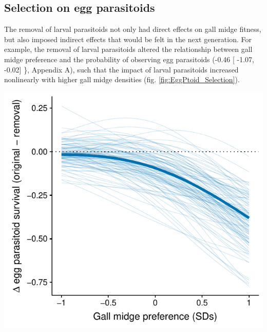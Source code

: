 \documentclass[11pt,]{article}
\let\origfigure\figure
\let\endorigfigure\endfigure
\renewenvironment{figure}[1][2] {
    \expandafter\origfigure\expandafter[H]
} {
    \endorigfigure
}
\begin{document}
\subsection{Selection on egg
parasitoids}\label{selection-on-egg-parasitoids}

The removal of larval parasitoids not only had direct effects on gall
midge fitness, but also imposed indirect effects that would be felt in
the next generation. For example, the removal of larval parasitoids
altered the relationship between gall midge preference and the
probability of observing egg parasitoids (-0.46 {[} -1.07, -0.02{]} \},
Appendix A), such that the impact of larval parasitoids increased
nonlinearly with higher gall midge densities (fig.
\ref{fig:EggPtoid_Selection}).

\begin{figure}
\centering
\includegraphics{../analyses/selection_on_Platygaster.pdf}
\caption{\label{fig:EggPtoid_Selection}Selection imposed by larval
parasitoids on egg parasitoids (\emph{Platygaster} sp.). The bold line
represents the average difference in the probability of observing the
egg parasitoid (original minus removal of larval parastioids) as a
function of gall midge oviposition preference. Thin lines represent
bootstrapped replicates to show the uncertainty in selection. For
clarity, we only display 100 bootstraps even though inferences are based
on 1,000 replicates. The decrease in the probability of observing egg
parasitoids at high gall-midge densities indicate that larval
parasitoids impose nonlinear selection on egg parasitoids.}
\end{figure}
\end{document}

